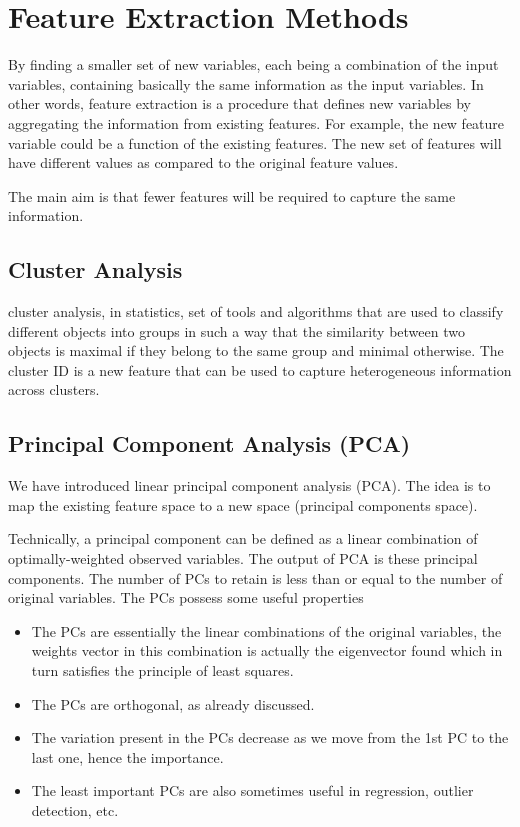 \documentclass[
]{article}
\begin{document}
\hypertarget{feature-extraction-methods}{%
\section{Feature Extraction Methods}\label{feature-extraction-methods}}

By finding a smaller set of new variables, each being a combination of
the input variables, containing basically the same information as the
input variables. In other words, feature extraction is a procedure that
defines new variables by aggregating the information from existing
features. For example, the new feature variable could be a function of
the existing features. The new set of features will have different
values as compared to the original feature values.

The main aim is that fewer features will be required to capture the same
information.

\hypertarget{cluster-analysis}{%
\subsection{Cluster Analysis}\label{cluster-analysis}}

cluster analysis, in statistics, set of tools and algorithms that are
used to classify different objects into groups in such a way that the
similarity between two objects is maximal if they belong to the same
group and minimal otherwise. The cluster ID is a new feature that can be
used to capture heterogeneous information across clusters.

\hypertarget{principal-component-analysis-pca}{%
\subsection{Principal Component Analysis
(PCA)}\label{principal-component-analysis-pca}}

We have introduced linear principal component analysis (PCA). The idea
is to map the existing feature space to a new space (principal
components space).

Technically, a principal component can be defined as a linear
combination of optimally-weighted observed variables. The output of PCA
is these principal components. The number of PCs to retain is less than
or equal to the number of original variables. The PCs possess some
useful properties

\begin{itemize}
\item
  The PCs are essentially the linear combinations of the original
  variables, the weights vector in this combination is actually the
  eigenvector found which in turn satisfies the principle of least
  squares.
\item
  The PCs are orthogonal, as already discussed.
\item
  The variation present in the PCs decrease as we move from the 1st PC
  to the last one, hence the importance.
\item
  The least important PCs are also sometimes useful in regression,
  outlier detection, etc.
\end{itemize}
\end{document}

